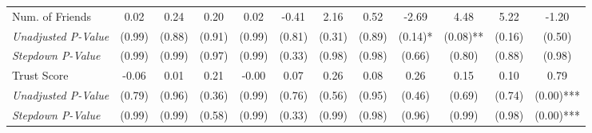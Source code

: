 \begin{tabular}{l c c c c c c c c c c c}
Num. of Friends & 0.02 & 0.24 & 0.20 & 0.02 & -0.41 & 2.16 & 0.52 & -2.69 & 4.48 & 5.22 & -1.20 \\
\quad \textit{Unadjusted P-Value} & (0.99) & (0.88) & (0.91) & (0.99) & (0.81) & (0.31) & (0.89) & (0.14)* & (0.08)** & (0.16) & (0.50) \\
\quad \textit{Stepdown P-Value} & (0.99) & (0.99) & (0.97) & (0.99) & (0.33) & (0.98) & (0.98) & (0.66) & (0.80) & (0.88) & (0.98) \\
Trust Score & -0.06 & 0.01 & 0.21 & -0.00 & 0.07 & 0.26 & 0.08 & 0.26 & 0.15 & 0.10 & 0.79 \\
\quad \textit{Unadjusted P-Value} & (0.79) & (0.96) & (0.36) & (0.99) & (0.76) & (0.56) & (0.95) & (0.46) & (0.69) & (0.74) & (0.00)*** \\
\quad \textit{Stepdown P-Value} & (0.99) & (0.99) & (0.58) & (0.99) & (0.33) & (0.99) & (0.98) & (0.96) & (0.99) & (0.98) & (0.00)*** \\
\bottomrule
\end{tabular}
